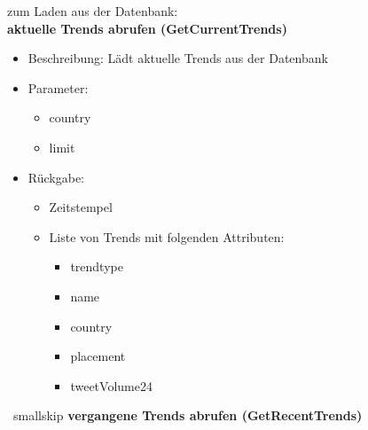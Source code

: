 \documentclass[conference]{IEEEtran}
\begin{document}
zum Laden aus der Datenbank:
\\
\smallskip
\textbf{aktuelle Trends abrufen (GetCurrentTrends)}
\begin{itemize}
    \item Beschreibung: Lädt aktuelle Trends aus der Datenbank
    \item Parameter:
        \begin{itemize}
            \item country
            \item limit
        \end{itemize}
    \item Rückgabe: 
        \begin{itemize}
            \item Zeitstempel
            \item Liste von Trends mit folgenden Attributen:
                \begin{itemize}
                    \item trendtype
                    \item name
                    \item country
                    \item placement
                    \item tweetVolume24
                \end{itemize}
        \end{itemize}
\end{itemize}
\
smallskip
\textbf{vergangene Trends abrufen (GetRecentTrends)}
\end{document}
